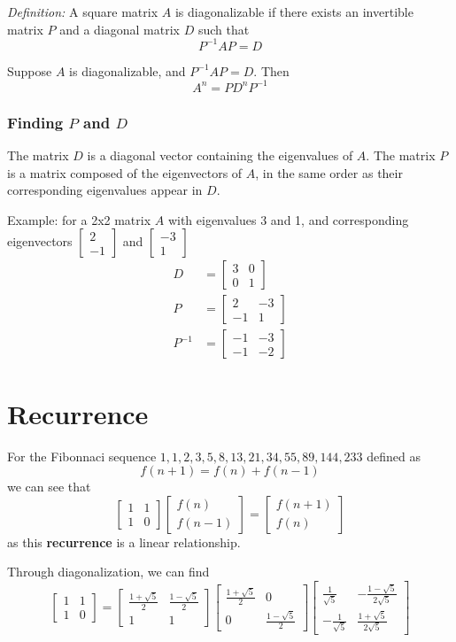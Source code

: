 \documentclass[12pt]{article}
\newcommand{\vectwo}[2]{\begin{bmatrix}#1\\#2\end{bmatrix}}
\begin{document}
\textit{Definition:} A square matrix $A$ is diagonalizable if there exists an invertible matrix $P$ and a diagonal matrix $D$ such that \[ P^{-1}AP = D \]

Suppose $A$ is diagonalizable, and $P^{-1}AP = D$. Then \[ A^n = PD^nP^{-1} \]

\subsubsection*{Finding $P$ and $D$}
The matrix $D$ is a diagonal vector containing the eigenvalues of $A$. The matrix $P$ is a matrix composed of the eigenvectors of $A$, in the same order as their corresponding eigenvalues appear in $D$.

Example: for a 2x2 matrix $A$ with eigenvalues 3 and 1, and corresponding eigenvectors $\vectwo{2}{-1}$ and $\vectwo{-3}{1}$
\begin{align*}
D &= \begin{bmatrix}3&0\\0&1\end{bmatrix}\\
P &= \begin{bmatrix}2&-3\\-1&1\end{bmatrix}\\
P^{-1} &= \begin{bmatrix}-1&-3\\-1&-2\end{bmatrix}
\end{align*}

\section*{Recurrence}
For the Fibonnaci sequence $1, 1, 2, 3, 5, 8, 13, 21, 34, 55, 89, 144, 233$ defined as \[ f(n+1) = f(n) + f(n-1) \] we can see that  \[ \begin{bmatrix}1&1\\1&0\end{bmatrix}\vectwo{f(n)}{f(n-1)} = \vectwo{f(n+1)}{f(n)} \] as this {\bf recurrence} is a linear relationship.

Through diagonalization, we can find \[ \begin{bmatrix}1&1\\1&0\end{bmatrix} = \begin{bmatrix}\frac{1+\sqrt{5}}{2}&\frac{1-\sqrt{5}}{2}\\1&1\end{bmatrix}\begin{bmatrix}\frac{1+\sqrt{5}}{2}&0\\0&\frac{1-\sqrt{5}}{2}\end{bmatrix}\begin{bmatrix}\frac{1}{\sqrt{5}}&-\frac{1-\sqrt{5}}{2\sqrt{5}}\\-\frac{1}{\sqrt{5}}&\frac{1+\sqrt{5}}{2\sqrt{5}}\end{bmatrix} \]
\end{document}
